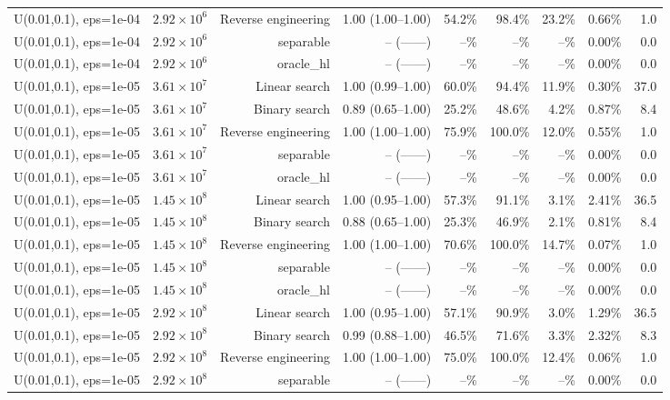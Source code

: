\begin{tabular}{llrrrrrrr}
U(0.01,0.1), eps=1e-04 & $2.92\times 10^{6}$ & Reverse engineering & 1.00 (1.00--1.00) & 54.2\% & 98.4\% & 23.2\% & 0.66\% & 1.0 \\
U(0.01,0.1), eps=1e-04 & $2.92\times 10^{6}$ & separable & -- (------) & --\% & --\% & --\% & 0.00\% & 0.0 \\
U(0.01,0.1), eps=1e-04 & $2.92\times 10^{6}$ & oracle_hl & -- (------) & --\% & --\% & --\% & 0.00\% & 0.0 \\
U(0.01,0.1), eps=1e-05 & $3.61\times 10^{7}$ & Linear search & 1.00 (0.99--1.00) & 60.0\% & 94.4\% & 11.9\% & 0.30\% & 37.0 \\
U(0.01,0.1), eps=1e-05 & $3.61\times 10^{7}$ & Binary search & 0.89 (0.65--1.00) & 25.2\% & 48.6\% & 4.2\% & 0.87\% & 8.4 \\
U(0.01,0.1), eps=1e-05 & $3.61\times 10^{7}$ & Reverse engineering & 1.00 (1.00--1.00) & 75.9\% & 100.0\% & 12.0\% & 0.55\% & 1.0 \\
U(0.01,0.1), eps=1e-05 & $3.61\times 10^{7}$ & separable & -- (------) & --\% & --\% & --\% & 0.00\% & 0.0 \\
U(0.01,0.1), eps=1e-05 & $3.61\times 10^{7}$ & oracle_hl & -- (------) & --\% & --\% & --\% & 0.00\% & 0.0 \\
U(0.01,0.1), eps=1e-05 & $1.45\times 10^{8}$ & Linear search & 1.00 (0.95--1.00) & 57.3\% & 91.1\% & 3.1\% & 2.41\% & 36.5 \\
U(0.01,0.1), eps=1e-05 & $1.45\times 10^{8}$ & Binary search & 0.88 (0.65--1.00) & 25.3\% & 46.9\% & 2.1\% & 0.81\% & 8.4 \\
U(0.01,0.1), eps=1e-05 & $1.45\times 10^{8}$ & Reverse engineering & 1.00 (1.00--1.00) & 70.6\% & 100.0\% & 14.7\% & 0.07\% & 1.0 \\
U(0.01,0.1), eps=1e-05 & $1.45\times 10^{8}$ & separable & -- (------) & --\% & --\% & --\% & 0.00\% & 0.0 \\
U(0.01,0.1), eps=1e-05 & $1.45\times 10^{8}$ & oracle_hl & -- (------) & --\% & --\% & --\% & 0.00\% & 0.0 \\
U(0.01,0.1), eps=1e-05 & $2.92\times 10^{8}$ & Linear search & 1.00 (0.95--1.00) & 57.1\% & 90.9\% & 3.0\% & 1.29\% & 36.5 \\
U(0.01,0.1), eps=1e-05 & $2.92\times 10^{8}$ & Binary search & 0.99 (0.88--1.00) & 46.5\% & 71.6\% & 3.3\% & 2.32\% & 8.3 \\
U(0.01,0.1), eps=1e-05 & $2.92\times 10^{8}$ & Reverse engineering & 1.00 (1.00--1.00) & 75.0\% & 100.0\% & 12.4\% & 0.06\% & 1.0 \\
U(0.01,0.1), eps=1e-05 & $2.92\times 10^{8}$ & separable & -- (------) & --\% & --\% & --\% & 0.00\% & 0.0 \\

\end{tabular}
